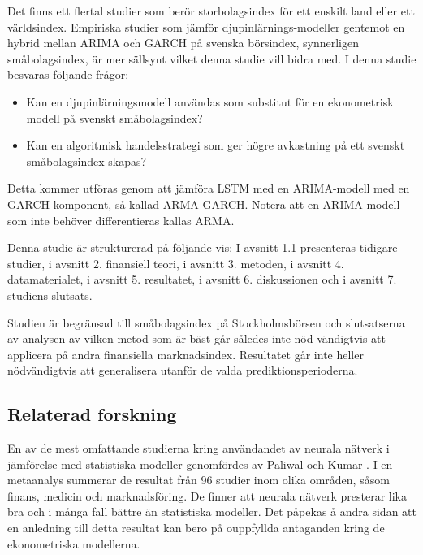 \documentclass[11pt]{article}
\numberwithin{equation}{section}
\numberwithin{table}{section}
\numberwithin{figure}{section}
\begin{document}
Det finns ett flertal studier som berör storbolagsindex för ett enskilt land eller ett världsindex. Empiriska studier som jämför djupinlärnings-modeller gentemot en hybrid mellan ARIMA och GARCH på svenska börsindex, synnerligen småbolagsindex, är mer sällsynt vilket denna studie vill bidra med. I denna studie besvaras följande frågor:

\begin{itemize}
    \item Kan en djupinlärningsmodell användas som substitut för en  ekonometrisk modell på svenskt småbolagsindex?
    \item Kan en algoritmisk handelsstrategi som ger högre avkastning på ett svenskt småbolagsindex skapas?
\end{itemize}

Detta kommer utföras genom att jämföra LSTM med en ARIMA-modell med en GARCH-komponent, så kallad ARMA-GARCH. Notera att en ARIMA-modell som inte behöver differentieras kallas ARMA.

\newpage
Denna studie är strukturerad på följande vis: I avsnitt 1.1 presenteras tidigare studier, i avsnitt 2. finansiell teori, i avsnitt 3. metoden, i avsnitt 4. datamaterialet, i avsnitt 5. resultatet, i avsnitt 6. diskussionen och i avsnitt 7. studiens slutsats.

Studien är begränsad till småbolagsindex på Stockholmsbörsen och slutsatserna av analysen av vilken metod som är bäst går således inte nöd-vändigtvis att applicera på andra finansiella marknadsindex. Resultatet går inte heller nödvändigtvis att generalisera utanför de valda prediktionsperioderna.




\subsection{Relaterad forskning}

En av de mest omfattande studierna kring användandet av neurala nätverk i jämförelse med statistiska modeller genomfördes av Paliwal och Kumar \parencite*{paliwal2009neural}. I en metaanalys summerar de resultat från 96 studier inom olika områden, såsom finans, medicin och marknadsföring. De finner att neurala nätverk presterar lika bra och i många fall bättre än statistiska modeller. Det påpekas å andra sidan att en anledning till detta resultat kan bero på ouppfyllda antaganden kring de ekonometriska modellerna. 
\end{document}
